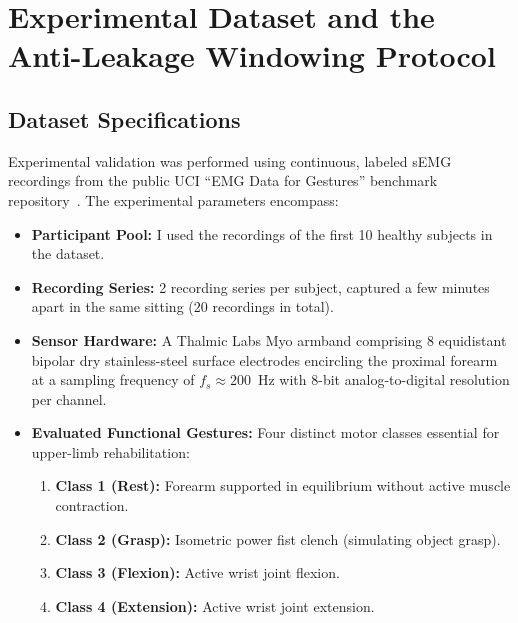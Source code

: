 \documentclass[11pt,a4paper]{article}
\begin{document}
\section{Experimental Dataset and the Anti-Leakage Windowing Protocol}

\subsection{Dataset Specifications}
Experimental validation was performed using continuous, labeled sEMG recordings from the public UCI ``EMG Data for Gestures'' benchmark repository~\cite{lobov2018}. The experimental parameters encompass:
\begin{itemize}
    \item \textbf{Participant Pool:} I used the recordings of the first 10 healthy subjects in the dataset.
    \item \textbf{Recording Series:} 2 recording series per subject, captured a few minutes apart in the same sitting (20 recordings in total).
    \item \textbf{Sensor Hardware:} A Thalmic Labs Myo armband comprising 8 equidistant bipolar dry stainless-steel surface electrodes encircling the proximal forearm at a sampling frequency of $f_s \approx 200$~Hz with 8-bit analog-to-digital resolution per channel.
    \item \textbf{Evaluated Functional Gestures:} Four distinct motor classes essential for upper-limb rehabilitation:
    \begin{enumerate}
        \item \textbf{Class 1 (Rest):} Forearm supported in equilibrium without active muscle contraction.
        \item \textbf{Class 2 (Grasp):} Isometric power fist clench (simulating object grasp).
        \item \textbf{Class 3 (Flexion):} Active wrist joint flexion.
        \item \textbf{Class 4 (Extension):} Active wrist joint extension.
    \end{enumerate}
\end{itemize}
\end{document}
